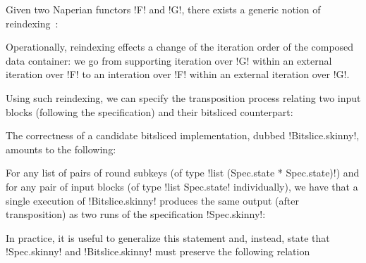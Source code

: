 \documentclass[draft,english]{jflart}
\begin{document}




Given two Naperian functors \coqe!F! and \coqe!G!, there exists a
generic notion of reindexing~\citep{gibbons:apl-icative}:
%

Operationally, reindexing effects a change of the iteration order of
the composed data container: we go from supporting iteration over
\coqe!G! within an external iteration over \coqe!F! to an interation
over \coqe!F! within an external iteration over \coqe!G!.


Using such reindexing, we can specify the transposition process
relating two input blocks (following the specification) and their
bitsliced counterpart:
%


The correctness of a candidate bitsliced implementation, dubbed
\coqe!Bitslice.skinny!, amounts to the following:
%
\begin{theo}
  For any list of pairs of round subkeys (of type
  \coqe!list (Spec.state * Spec.state)!)
  and for any pair of input blocks (of type
  \coqe!list Spec.state!
  individually), we have that a single execution of
  \coqe!Bitslice.skinny! produces the same output (after
  transposition) as two runs of the specification \coqe!Spec.skinny!:

\end{theo}


In practice, it is useful to generalize this statement and, instead,
state that \coqe!Spec.skinny! and \coqe!Bitslice.skinny! must preserve
the following relation
%
\end{document}
